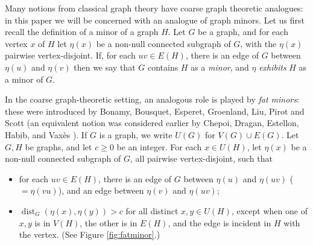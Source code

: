 \documentclass[titlepage,11pt]{article}
\newcommand{\dist}{\operatorname{dist}}
\begin{document}
	Many notions from classical graph theory have coarse graph theoretic analogues: in this paper we will be concerned with an analogue of graph minors.	
	Let us first recall the definition of a minor of a graph $H$.  
	Let $G$ be a graph, and for each vertex $x$ of $H$ let $\eta(x)$ be a non-null connected subgraph of 
	$G$, with the $\eta(x)$ pairwise vertex-disjoint.  If, for each $uv\in E(H)$, there is an edge of $G$ between $\eta(u)$ and $\eta(v)$ then we say that $G$ contains $H$ as a {\em minor}, and $\eta$ {\em exhibits} $H$ as a minor 
	of $G$. 
	
	In the coarse graph-theoretic setting, an analogous role is played by {\em fat minors}: these were introduced by 
	Bonamy, Bousquet, Esperet, Groenland, Liu, Pirot and Scott \cite{bonamy}
	(an equivalent notion was considered earlier by Chepoi, Dragan, Estellon, Habib, and Vax\`es \cite{chepoi}).
	If $G$ is a graph, we write $U(G)$ for $V(G)\cup E(G)$. 
	Let $G,H$ be graphs, and let $c\ge 0$ be an integer. For each $x\in U(H)$, let $\eta(x)$ be a non-null connected subgraph of 
	$G$, all pairwise vertex-disjoint, such that 
	\begin{itemize}
		\item for each $uv\in E(H)$, there is an edge of $G$ between $\eta(u)$ and $\eta(uv)$ ($=\eta(vu)$), and an edge between $\eta(v)$ and $\eta(uv)$;
		\item $\dist_G(\eta(x),\eta(y))>c$ for all distinct $x,y\in U(H)$, except when one of $x,y$ is in $V(H)$, the other is 
		in $E(H)$,
		and the edge is incident in $H$ with the vertex. (See Figure \ref{fig:fatminor}.)
	\end{itemize}
\end{document}
